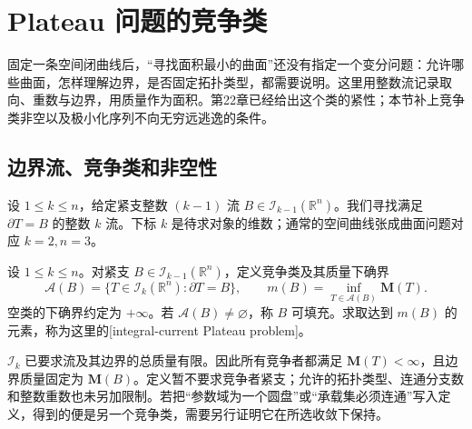 
% 
% 

\section{Plateau 问题的竞争类}
\label{g3:sec:2301}
固定一条空间闭曲线后，“寻找面积最小的曲面”还没有指定一个变分问题：允许哪些曲面，怎样理解边界，是否固定拓扑类型，都需要说明。这里用整数流记录取向、重数与边界，用质量作为面积。第22章已经给出这个类的紧性；本节补上竞争类非空以及极小化序列不向无穷远逃逸的条件。

\subsection{边界流、竞争类和非空性}
\label{g3:subsec:2301:01}
设 \(1\le k\le n\)，给定紧支整数 \((k-1)\) 流 \(B\in\mathcal I_{k-1}(\mathbb R^n)\)。我们寻找满足 \(\partial T=B\) 的整数 \(k\) 流。下标 \(k\) 是待求对象的维数；通常的空间曲线张成曲面问题对应 \(k=2,n=3\)。

\begin{definition}\label{g3:def:plateau-competitor-class}
	设 \(1\le k\le n\)。对紧支 \(B\in\mathcal I_{k-1}(\mathbb R^n)\)，定义竞争类及其质量下确界
	\begin{equation}\label{g3:eq:plateau-competitor-class}
		\mathcal A(B)=\{T\in\mathcal I_k(\mathbb R^n):\partial T=B\},
		\qquad m(B)=\inf_{T\in\mathcal A(B)}\mathbf M(T).
	\end{equation}
	空类的下确界约定为 \(+\infty\)。若 \(\mathcal A(B)\ne\varnothing\)，称 \(B\) 可填充。求取达到 \(m(B)\) 的元素，称为这里的[integral-current Plateau problem]。
\end{definition}

\(\mathcal I_k\) 已要求流及其边界的总质量有限。因此所有竞争者都满足 \(\mathbf M(T)<\infty\)，且边界质量固定为 \(\mathbf M(B)\)。定义暂不要求竞争者紧支；允许的拓扑类型、连通分支数和整数重数也未另加限制。若把“参数域为一个圆盘”或“承载集必须连通”写入定义，得到的便是另一个竞争类，需要另行证明它在所选收敛下保持。

